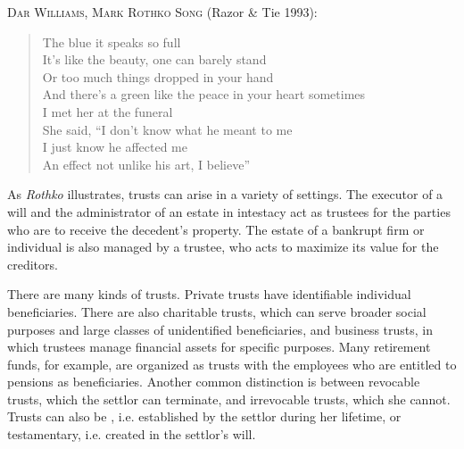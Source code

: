 

\item \textsc{Dar Williams, Mark Rothko Song} (Razor \& Tie
1993):
\begin{verse}
The blue it speaks so full\\
It's like the beauty, one can barely stand\\
Or too much things dropped in your hand\\
And there's a green like the peace in your heart sometimes \\[6pt]

I met her at the funeral\\
She said, ``I don't know what he meant to me\\
I just know he affected me\\
An effect not unlike his art, I believe''
\end{verse}

\item As \textit{Rothko} illustrates, trusts can arise in a variety of settings.
The executor of a will and the administrator of an estate in intestacy act as
trustees for the parties who are to receive the decedent's property. The estate
of a bankrupt firm or individual is also managed by a trustee, who acts to
maximize its value for the creditors.


There are many kinds of trusts. Private trusts have identifiable individual
beneficiaries. There are also charitable trusts, which can serve broader social
purposes and large classes of unidentified beneficiaries, and business trusts,
in which trustees manage financial assets for specific purposes. Many retirement
funds, for example, are organized as trusts with the employees who are entitled
to pensions as beneficiaries. Another common distinction is between revocable
trusts, which the settlor can terminate, and irrevocable trusts, which she
cannot. Trusts can also be , i.e. established by the settlor
during her lifetime, or testamentary, i.e. created in the settlor's will.



